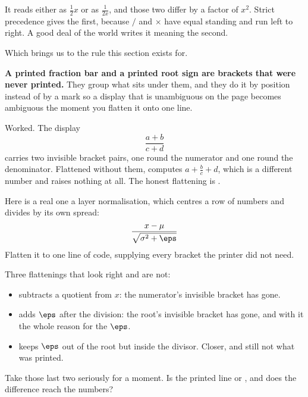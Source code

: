 \begin{fr}
\begin{ansblock}
It reads either as $\frac{1}{2}x$ or as $\frac{1}{2x}$, and those two differ
by a factor of $x^{2}$. Strict precedence gives the first, because $/$ and
$\times$ have equal standing and run left to right. A good deal of the world
writes it meaning the second.
\end{ansblock}

Which brings us to the rule this section exists for.

\textbf{A printed fraction bar and a printed root sign are brackets that were
never printed.} They group what sits under them, and they do it by position
instead of by a mark \dash{} so a display that is unambiguous on the page
becomes ambiguous the moment you flatten it onto one line.

Worked. The display
\[ \frac{a + b}{c + d} \]
carries two invisible bracket pairs, one round the numerator and one round the
denominator. Flattened without them,  computes
$a + \frac{b}{c} + d$, which is a different number and raises nothing at all.
The honest flattening is .

\yourturn
Here is a real one \dash{} a layer normalisation, which centres a row of
numbers and divides by its own spread:
\[ \frac{x - \mu}{\sqrt{\sigma^{2} + \eps}} \]
Flatten it to one line of code, supplying every bracket the printer did not
need.
\dotline
\nextframe
\end{fr}

\begin{fr}
\begin{ansblock}
\begin{center}
\end{center}
Three flattenings that look right and are not:

\begin{itemize}
\item {} subtracts a quotient from $x$: the
  numerator's invisible bracket has gone.
\item {} adds $\eps$ after the division: the
  root's invisible bracket has gone, and with it the whole reason for the
  $\eps$.
\item {} keeps $\eps$ out of the root but
  inside the divisor. Closer, and still not what was printed.
\end{itemize}
\end{ansblock}

Take those last two seriously for a moment. Is the printed line
 or , and does the difference
reach the numbers?
\nextframe
\end{fr}

